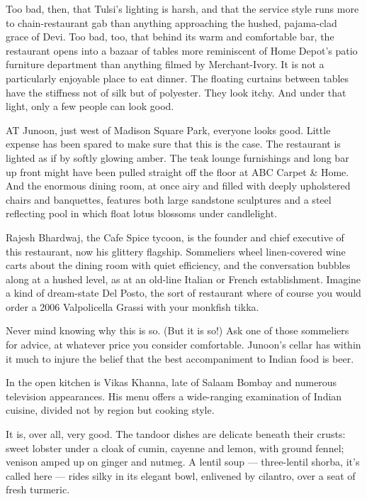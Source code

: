 Too bad, then, that Tulsi's lighting is harsh, and that the service
style runs more to chain-restaurant gab than anything approaching the
hushed, pajama-clad grace of Devi. Too bad, too, that behind its warm
and comfortable bar, the restaurant opens into a bazaar of tables more
reminiscent of Home Depot's patio furniture department than anything
filmed by Merchant-Ivory. It is not a particularly enjoyable place to
eat dinner. The floating curtains between tables have the stiffness not
of silk but of polyester. They look itchy. And under that light, only a
few people can look good.

AT Junoon, just west of Madison Square Park, everyone looks good. Little
expense has been spared to make sure that this is the case. The
restaurant is lighted as if by softly glowing amber. The teak lounge
furnishings and long bar up front might have been pulled straight off
the floor at ABC Carpet \& Home. And the enormous dining room, at once
airy and filled with deeply upholstered chairs and banquettes, features
both large sandstone sculptures and a steel reflecting pool in which
float lotus blossoms under candlelight.

Rajesh Bhardwaj, the Cafe Spice tycoon, is the founder and chief
executive of this restaurant, now his glittery flagship. Sommeliers
wheel linen-covered wine carts about the dining room with quiet
efficiency, and the conversation bubbles along at a hushed level, as at
an old-line Italian or French establishment. Imagine a kind of
dream-state Del Posto, the sort of restaurant where of course you would
order a 2006 Valpolicella Grassi with your monkfish tikka.

Never mind knowing why this is so. (But it is so!) Ask one of those
sommeliers for advice, at whatever price you consider comfortable.
Junoon's cellar has within it much to injure the belief that the best
accompaniment to Indian food is beer.

In the open kitchen is Vikas Khanna, late of Salaam Bombay and numerous
television appearances. His menu offers a wide-ranging examination of
Indian cuisine, divided not by region but cooking style.

It is, over all, very good. The tandoor dishes are delicate beneath
their crusts: sweet lobster under a cloak of cumin, cayenne and lemon,
with ground fennel; venison amped up on ginger and nutmeg. A lentil soup
--- three-lentil shorba, it's called here --- rides silky in its elegant
bowl, enlivened by cilantro, over a seat of fresh turmeric.

